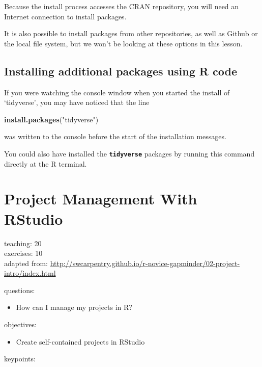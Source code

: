 \documentclass[]{book}
\newenvironment{Shaded}{\begin{snugshade}}{\end{snugshade}}
\newcommand{\KeywordTok}[1]{\textcolor[rgb]{0.13,0.29,0.53}{\textbf{#1}}}
\newcommand{\StringTok}[1]{\textcolor[rgb]{0.31,0.60,0.02}{#1}}
\newcommand{\NormalTok}[1]{#1}
\providecommand{\tightlist}{%
  \setlength{\itemsep}{0pt}\setlength{\parskip}{0pt}}
\begin{document}
Because the install process accesses the CRAN repository, you will need
an Internet connection to install packages.

It is also possible to install packages from other repositories, as well
as Github or the local file system, but we won't be looking at these
options in this lesson.

\section{Installing additional packages using R
code}\label{installing-additional-packages-using-r-code}

If you were watching the console window when you started the install of
`tidyverse', you may have noticed that the line

\begin{Shaded}
\begin{Highlighting}[]
\KeywordTok{install.packages}\NormalTok{(}\StringTok{"tidyverse"}\NormalTok{)}
\end{Highlighting}
\end{Shaded}

was written to the console before the start of the installation
messages.

You could also have installed the \textbf{\texttt{tidyverse}} packages
by running this command directly at the R terminal.

\chapter{Project Management With
RStudio}\label{project-management-with-rstudio}

teaching: 20\\
exercises: 10\\
adapted from:
\url{http://swcarpentry.github.io/r-novice-gapminder/02-project-intro/index.html}

questions:

\begin{itemize}
\tightlist
\item
  How can I manage my projects in R?
\end{itemize}

objectives:

\begin{itemize}
\tightlist
\item
  Create self-contained projects in RStudio
\end{itemize}

keypoints:
\end{document}
